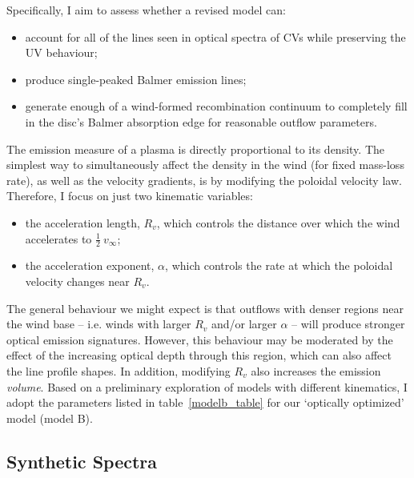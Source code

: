 Specifically, I aim to assess whether a revised model can:

\begin{itemize}
         \item account for all of the lines seen in optical spectra 
         of CVs while preserving
the UV behaviour;
         \item produce single-peaked Balmer emission lines; 
         \item generate enough of a wind-formed recombination continuum
to completely fill in the disc's Balmer absorption edge for 
reasonable outflow parameters.
\end{itemize} 

The emission measure of a plasma is directly proportional to its density.
The simplest way to simultaneously affect the density in the wind (for fixed mass-loss rate),
as well as the velocity gradients, is by modifying the poloidal velocity
law. Therefore, I focus on just two kinematic variables:

\begin{itemize}
         \item the acceleration length, $R_v$, which controls the
        distance over which the wind accelerates to $\frac{1}{2}~v_{\infty}$;
         \item the acceleration exponent, $\alpha$, which controls the rate 
         at which the poloidal velocity changes near $R_v$.
\end{itemize} 

The general behaviour we might expect is that outflows with denser
regions near the wind base -- i.e. winds with larger $R_{v}$ and/or
larger $\alpha$ -- will produce stronger optical emission signatures. 
However, this behaviour may be moderated by the effect of the increasing
optical depth through this region, which can also affect the line profile shapes. 
In addition, modifying $R_v$ also increases the emission {\em volume}.
Based on a preliminary exploration of models with different kinematics,
I adopt the parameters listed in table~\ref{modelb_table}
for our `optically optimized' model (model B). 




\subsection{Synthetic Spectra}

